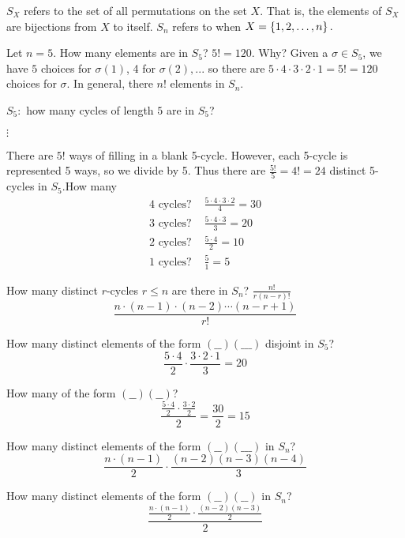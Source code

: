 $S_X$ refers to the set of all permutations on the set $X$. That is, the elements of $S_X$ are bijections from $X$ to itself. $S_n$ refers to when $X=\left\{1,2,\ldots,n\right\}.$

Let $n=5$. How many elements are in $S_5$? $5!=120$. Why? Given a $\sigma \in S_5$, we have $5$ choices for $\sigma(1)$, 4 for $\sigma(2),...$ so there are $5\cdot 4 \cdot 3 \cdot 2 \cdot 1=5! = 120$ choices for $\sigma$. In general, there $n!$ elements in $S_n$.

$S_5:$ how many cycles of length $5$ are in $S_5$?


$\vdots$

There are $5!$ ways of filling in a blank 5-cycle. However, each 5-cycle is represented 5 ways, so we divide by 5. Thus there are $\frac{5!}{5} = 4! = 24$ distinct 5-cycles in $S_5$.How many
\begin{align*}
    \text{4 cycles? } & \frac{5\cdot4\cdot3\cdot2}{4} = 30 \\
    \text{3 cycles? } & \frac{5\cdot4\cdot3}{3} = 20 \\
    \text{2 cycles? } & \frac{5\cdot4}{2} = 10 \\
    \text{1 cycles? } & \frac{5}{1} = 5
\end{align*}

How many distinct $r$-cycles $r \leq n$ are there in $S_n$? $\frac{n!}{r(n-r)!}$
$$\frac{n\cdot(n-1)\cdot(n-2)\cdots(n-r+1)}{r!}$$

How many distinct elements of the form $(\_ \_)(\_ \_ \_)$ disjoint in $S_5$?
$$\frac{5\cdot4}{2} \cdot \frac{3\cdot2\cdot1}{3} = 20$$

How many of the form $(\_ \_)(\_ \_)$?
$$\frac{\frac{5\cdot4}{2} \cdot \frac{3\cdot2}{2}}{2} = \frac{30}{2}=15$$

How many distinct elements of the form $(\_ \_)(\_ \_ \_)$ in $S_n$?
$$\frac{n\cdot(n-1)}{2} \cdot \frac{(n-2)(n-3)(n-4)}{3}$$

How many distinct elements of the form $(\_ \_)(\_ \_)$ in $S_n$?
$$\frac{\frac{n\cdot(n-1)}{2} \cdot \frac{(n-2)(n-3)}{2}}{2}$$

